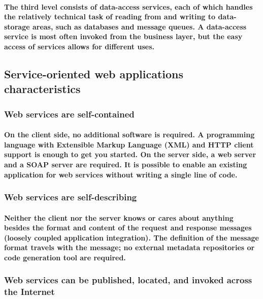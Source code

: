 \documentclass[12pt,a4paper]{article}
\begin{document}
    \paragraph{The third level consists of data-access services, each of which handles the relatively technical task of reading from and writing to data-storage areas, such as databases and message queues. A data-access service is most often invoked from the business layer, but the easy access of services allows for different uses. 
    }

   \subsection{Service-oriented web applications characteristics}

    \subsubsection{Web services are self-contained}

    \paragraph{On the client side, no additional software is required. A programming language with Extensible Markup Language (XML) and HTTP client support is enough to get you started. On the server side, a web server and a SOAP server are required. It is possible to enable an existing application for web services without writing a single line of code.
    }

    \subsubsection{Web services are self-describing}

    \paragraph{Neither the client nor the server knows or cares about anything besides the format and content of the request and response messages (loosely coupled application integration). The definition of the message format travels with the message; no external metadata repositories or code generation tool are required.
    }

    \subsubsection{Web services can be published, located, and invoked across the Internet}
\end{document}
